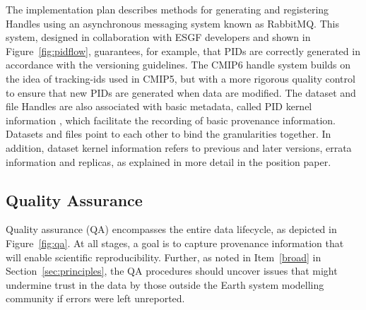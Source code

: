 \documentclass[gmd,manuscript]{copernicus}
\begin{document}
The implementation plan describes methods for generating and
registering Handles using an asynchronous messaging system known as
RabbitMQ. This system, designed in collaboration with ESGF developers
and shown in Figure~\ref{fig:pidflow}, guarantees, for example, that
PIDs are correctly generated in accordance with the versioning
guidelines. The CMIP6 handle system builds on the idea of tracking-ids
used in CMIP5, but with a more rigorous quality control to ensure that
new PIDs are generated when data are modified. The dataset and file
Handles are also associated with basic metadata, called PID kernel
information \citep{ref:zhouetal2018}, which facilitate the recording
of basic provenance information. Datasets and files point to each
other to bind the granularities together. In addition, dataset kernel
information refers to previous and later versions, errata information
and replicas, as explained in more detail in the position paper.

\subsection{Quality Assurance}
\label{sec:qa}

Quality assurance (QA) encompasses the entire data lifecycle, as
depicted in Figure~\ref{fig:qa}. At all stages, a goal is to capture
provenance information that will enable scientific reproducibility.
Further, as noted in Item~\ref{broad} in Section~\ref{sec:principles},
the QA procedures should uncover issues that might undermine trust in
the data by those outside the Earth system modelling community if
errors were left unreported.

\begin{figure*}
  \begin{center}
  \end{center}
  \caption{Schematic of the phases of quality assurance, with earlier
    stages in the hands of modelling centres (left), and more formal
    long-term data curation stages at right. Quality assurance is
    applied both to the data (D, above) as well as the metadata (M)
    describing the data. Figure drawn from the WIP's Quality Assurance
    position paper.}
  \label{fig:qa}
\end{figure*}
\end{document}
